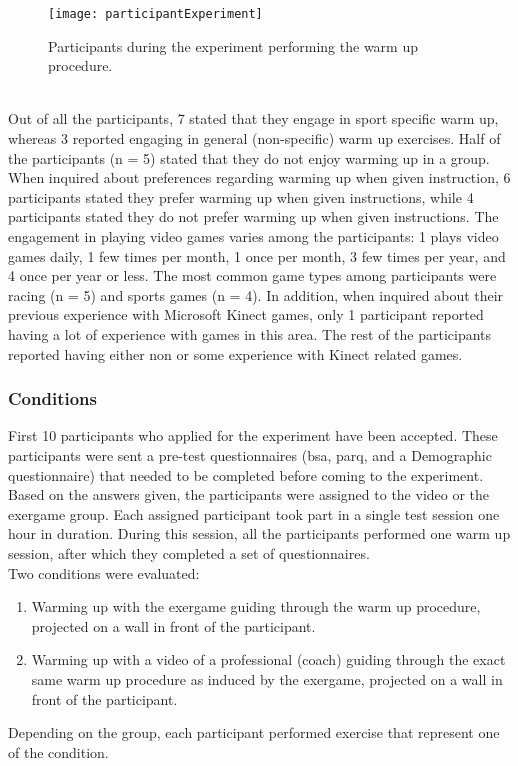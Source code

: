 \begin{figure}[h]
    \centering
    \texttt{[image: participantExperiment]}
    \caption{Participants during the experiment performing the warm up procedure.}
    \label{fig:participants}
\end{figure}\\
Out of all the participants, 7 stated that they engage in sport specific warm up, whereas 3 reported engaging in general  (non-specific) warm up exercises. Half of the participants (n = 5) stated that they do not enjoy warming up in a group. When inquired about preferences regarding warming up when given instruction, 6 participants stated they prefer warming up when given instructions, while 4 participants stated they do not prefer warming up when given instructions. The engagement in playing video games varies among the participants: 1 plays video games daily, 1 few times per month, 1 once per month, 3 few times per year, and 4 once per year or less. The most common game types among participants were racing (n = 5) and sports games (n = 4). In addition, when inquired about their previous experience with Microsoft Kinect games, only 1 participant reported having a lot of experience with games in this area. The rest of the participants reported having either non or some experience with Kinect related games.
\subsubsection{Conditions}
First 10 participants who applied for the experiment have been accepted. These participants were sent a pre-test questionnaires (\acrshort{bsa}, \acrshort{parq}, and a Demographic questionnaire) that needed to be completed before coming to the experiment. Based on the answers given, the participants were assigned to the video or the exergame group. Each assigned participant took part in a single test session one hour in duration. During this session, all the participants  performed one warm up session, after which they completed a set of questionnaires. \\Two conditions were evaluated:
\begin{enumerate}
\item Warming up with the exergame guiding through the warm up procedure, projected on a wall in front of the participant.
\item Warming up with a video of a professional (coach) guiding through the exact same warm up procedure as induced by the exergame, projected on a wall in front of the participant.
\end{enumerate}
Depending on the group, each participant performed exercise that represent one of the condition.
